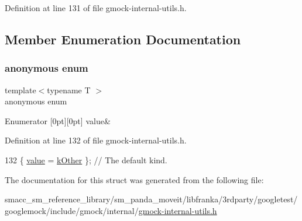 Definition at line 131 of file gmock-\/internal-\/utils.\+h.



\subsection{Member Enumeration Documentation}
\mbox{\label{structtesting_1_1internal_1_1KindOf_a55a5b5bd128ab096347b33bdfef12c60}} 
\subsubsection{\texorpdfstring{anonymous enum}{anonymous enum}}
{\footnotesize\ttfamily template$<$typename T $>$ \\
anonymous enum}

\begin{DoxyEnumFields}{Enumerator}
[0pt][0pt]{}\mbox{\label{structtesting_1_1internal_1_1KindOf_a55a5b5bd128ab096347b33bdfef12c60a30d28b30579739dfb2d410825ac3aaa8}} 
value&\\
\hline

\end{DoxyEnumFields}


Definition at line 132 of file gmock-\/internal-\/utils.\+h.


\begin{DoxyCode}
132 \{ \hyperlink{structtesting_1_1internal_1_1KindOf_a55a5b5bd128ab096347b33bdfef12c60a30d28b30579739dfb2d410825ac3aaa8}{value} = \hyperlink{namespacetesting_1_1internal_aa8747bda20137c9aa7f846dee830e686ad47f29150ab7a9ec8ce2491f44537347}{kOther} \};  \textcolor{comment}{// The default kind.}
\end{DoxyCode}


The documentation for this struct was generated from the following file\+:\begin{DoxyCompactItemize}
\item 
smacc\+\_\+sm\+\_\+reference\+\_\+library/sm\+\_\+panda\+\_\+moveit/libfranka/3rdparty/googletest/googlemock/include/gmock/internal/\hyperlink{gmock-internal-utils_8h}{gmock-\/internal-\/utils.\+h}\end{DoxyCompactItemize}
